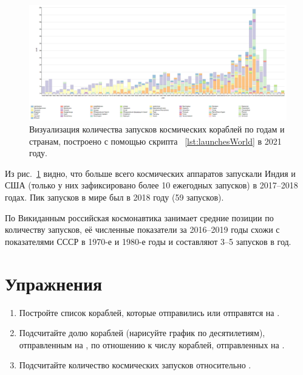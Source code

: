 \begin{figure}[h!]
  \includegraphics[width=\linewidth]{graphics/chapter/spacecraft_space_station/Visualization of the number of spacecraft launches by year and country 2021.png}
  \caption[График мир]{Визуализация количества запусков космических кораблей по годам и странам, построено с помощью скрипта ~\ref{lst:launchesWorld} в 2021 году.}%
  \label{fig:launchesWorld}%
\end{figure}

\label{question:spacecraft_3}

Из рис.~\ref{fig:launchesWorld} видно, что больше всего космических аппаратов 
запускали Индия и США 
(только у них зафиксировано более 10 ежегодных запусков) в 2017--2018 годах. 
Пик запусков в мире был в 2018 году (59 запусков). 

По Викиданным российская космонавтика занимает средние позиции по количеству запусков, 
её численные показатели за 2016--2019 годы схожи с показателями СССР в 1970-е и 1980-е годы 
и составляют 3--5 запусков в год.

\section{Упражнения}
\begin{enumerate}
  \item Постройте список кораблей, которые отправились или отправятся на .
  \item Подсчитайте долю кораблей (нарисуйте график по десятилетиям), 
        отправленным на , 
        по отношению к числу кораблей, отправленных на .
  \item Подсчитайте количество  космических запусков 
      относительно .%
%
\end{enumerate}
